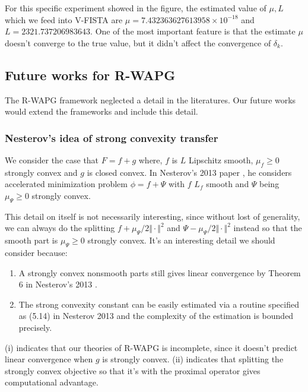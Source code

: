 \documentclass[12pt]{article}
\begin{document}
            For this specific experiment showed in the figure, the estimated value of $\mu, L$ which we feed into V-FISTA are $\mu = 7.432363627613958\times 10^{-18}$ and $L = 2321.737206983643$. 
            One of the most important feature is that the estimate $\mu$ doesn't converge to the true value, but it didn't affect the convergence of $\delta_k$. 

    
    \subsection{Future works for R-WAPG}
        The R-WAPG framework neglected a detail in the literatures. 
        Our future works would extend the frameworks and include this detail. 
        \subsubsection{Nesterov's idea of strong convexity transfer}
            We consider the case that $F = f + g$ where, $f$ is $L$ Lipschitz smooth, $\mu_f \ge 0$ strongly convex and $g$ is closed convex. 
            In Nesterov's 2013 paper \cite{nesterov_gradient_2013}, he considers accelerated  minimization problem $\phi = f + \Psi$ with $f$ $L_f$ smooth and $\Psi$ being $\mu_\Psi \ge 0$ strongly convex. 
            \par
            This detail on itself is not necessarily interesting, since without lost of generality, we can always do the splitting $f + \mu_\Psi/2 \Vert \cdot\Vert^2$ and $\Psi - \mu_\Psi/2\Vert \cdot\Vert^2$ instead so that the smooth part is $\mu_\Psi \ge 0$ strongly convex. 
            It's an interesting detail we should consider because: 
            \begin{enumerate}
                \item A strongly convex nonsmooth parts still gives linear convergence by Theorem 6 in Nesterov's 2013 \cite{nesterov_gradient_2013}. 
                \item The strong convexity constant can be easily estimated via a routine specified as (5.14) in Nesterov 2013 \cite{nesterov_gradient_2013} and the complexity of the estimation is bounded precisely. 
            \end{enumerate}
            (i) indicates that our theories of R-WAPG is incomplete, since it doesn't predict linear convergence when $g$ is strongly convex. 
            (ii) indicates that splitting the strongly convex objective so that it's with the proximal operator gives computational advantage. 
\end{document}
